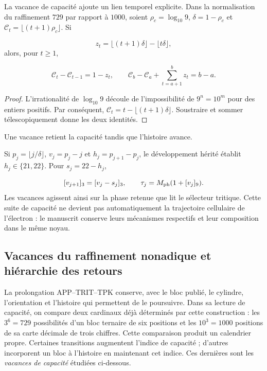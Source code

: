 La vacance de capacité ajoute un lien temporel explicite. Dans la normalisation du raffinement \(729\) par rapport à \(1000\), soient \(\rho_c=\log_{10}9\), \(\delta=1-\rho_c\) et \(\mathcal C_t=\lfloor(t+1)\rho_c\rfloor\). Si

\[
z_t=\lfloor(t+1)\delta\rfloor-\lfloor t\delta\rfloor,
\]
alors, pour \(t\geq1\),

\[
\mathcal C_t-\mathcal C_{t-1}=1-z_t,
\qquad
\mathcal C_b-\mathcal C_a+\sum_{t=a+1}^b z_t=b-a.
\]
\begin{proof}
L'irrationalité de \(\log_{10}9\) découle de l'impossibilité de \(9^n=10^m\) pour des entiers positifs. Par conséquent, \(\mathcal C_t=t-\lfloor(t+1)\delta\rfloor\). Soustraire et sommer télescopiquement donne les deux identités. \end{proof}
Une vacance retient la capacité tandis que l'histoire avance.

Si \(p_j=\lfloor j/\delta\rfloor\), \(v_j=p_j-j\) et \(h_j=p_{j+1}-p_j\), le développement hérité établit \(h_j\in\{21,22\}\). Pour \(s_j=22-h_j\),

\[
[v_{j+1}]_3=[v_j-s_j]_3,\qquad
\tau_j=M_{\rm ph}(1+[v_j]_9).
\]
Les vacances agissent ainsi sur la phase retenue que lit le sélecteur tritique. Cette suite de capacité ne devient pas automatiquement la trajectoire cellulaire de l'électron : le manuscrit conserve leurs mécanismes respectifs et leur composition dans le même noyau.


\subsection{Vacances du raffinement nonadique et hiérarchie des retours}
\label{viii:vac-add-seccion}

La prolongation APP--TRIT--TPK conserve, avec le bloc publié, le
cylindre, l'orientation et l'histoire qui permettent de le poursuivre. Dans sa
lecture de capacité, on compare deux cardinaux déjà déterminés par cette
construction : les \(3^6=729\) possibilités d'un bloc ternaire de six
positions et les \(10^3=1000\) positions de sa carte décimale de trois
chiffres. Cette comparaison produit un calendrier propre. Certaines
transitions augmentent l'indice de capacité ; d'autres incorporent un bloc
à l'histoire en maintenant cet indice. Ces dernières sont les
\emph{vacances de capacité} étudiées ci-dessous.

